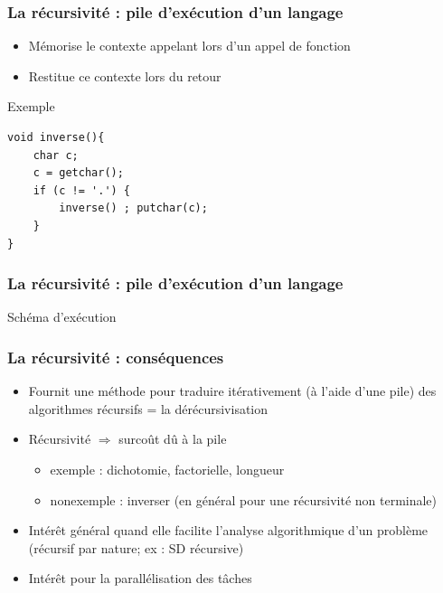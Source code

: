 \documentclass[table,handout,tikz,12pt,svgnames]{beamer}
\begin{document}
\begin{frame}[fragile=singleslide]
	\frametitle{La récursivité : pile d'exécution d'un langage}
	\vspace{-0.2cm}
	\begin{block}{}
		\begin{itemize}
			\item Mémorise le contexte appelant lors d'un appel de fonction
			\item Restitue ce contexte lors du retour
		\end{itemize}
	\end{block}
	\begin{block}{Exemple} %
		\begin{verbatim}
void inverse(){
	char c;
	c = getchar();
	if (c != '.') {
		inverse() ; putchar(c);
	}
}
		\end{verbatim}
	\end{block}
\end{frame}

\begin{frame}[fragile=singleslide]
	\frametitle{La récursivité : pile d'exécution d'un langage}
	\vspace{-4cm}
	\begin{block}{Schéma d'exécution}
	\end{block}
\end{frame}

\begin{frame}[fragile=singleslide]
	\frametitle{La récursivité : conséquences}
	\vspace{-0.2cm}
	\begin{block}{}
		\begin{itemize}
			\item Fournit une méthode pour traduire itérativement (à l'aide d'une pile) des 
			algorithmes récursifs = la dérécursivisation
			\item Récursivité $\Rightarrow$ surcoût dû à la pile
			\begin{itemize}
				\item exemple : dichotomie, factorielle, longueur
				\item non­exemple : inverser (en général pour une récursivité non terminale)
			\end{itemize}
			\item Intérêt général quand elle facilite l'analyse algorithmique d'un problème (récursif par nature; ex : SD récursive)
			\item Intérêt pour la parallélisation des tâches
		\end{itemize}
	\end{block}
\end{frame}
\end{document}
